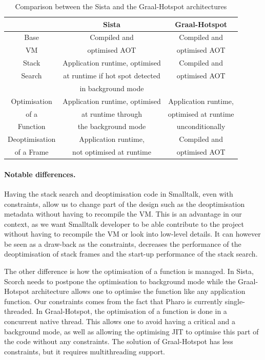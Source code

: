 \documentclass[a4paper,12pt,twoside]{../includes/ThesisStyle}
\begin{document}
\begin{table}
  \caption{Comparison between the Sista and the Graal-Hotspot architectures}
  \vspace{0.1cm}
  \centering
  \begin{tabular}{c||c|c}
    \toprule
    & Sista & Graal-Hotspot \\
    \midrule
    \midrule
	Base & Compiled and & Compiled and \\
	VM & optimised AOT & optimised AOT \\
    \midrule
	Stack & Application runtime, optimised & Compiled and \\
	Search & at runtime if hot spot detected & optimised AOT \\
	 & in background mode & \\
    \midrule
	Optimisation & Application runtime, optimised & Application runtime,\\
	of a & at runtime through & optimised at runtime \\
	Function & the background mode & unconditionally \\
    \midrule
	Deoptimisation & Application runtime, & Compiled and \\
	of a Frame & not optimised at runtime & optimised AOT \\
	\bottomrule
  \end{tabular}
  \label{tbl:comparison}
\end{table}

\paragraph{Notable differences.}Having the stack search and deoptimisation code in Smalltalk, even with constraints, allow us to change part of the design such as the deoptimisation metadata without having to recompile the VM. This is an advantage in our context, as we want Smalltalk developer to be able contribute to the project without having to recompile the VM or look into low-level details. It can however be seen as a draw-back as the constraints, decreases the performance of the deoptimisation of stack frames and the start-up performance of the stack search.

The other difference is how the optimisation of a function is managed. In Sista, Scorch needs to postpone the optimisation to background mode while the Graal-Hotspot architecture allows one to optimise the function like any application function. Our constraints comes from the fact that Pharo is currently single-threaded. In Graal-Hotspot, the optimisation of a function is done in a concurrent native thread. This allows one to avoid having a critical and a background mode, as well as allowing the optimising JIT to optimise this part of the code without any constraints. The solution of Graal-Hotspot has less constraints, but it requires multithreading support.
\end{document}
